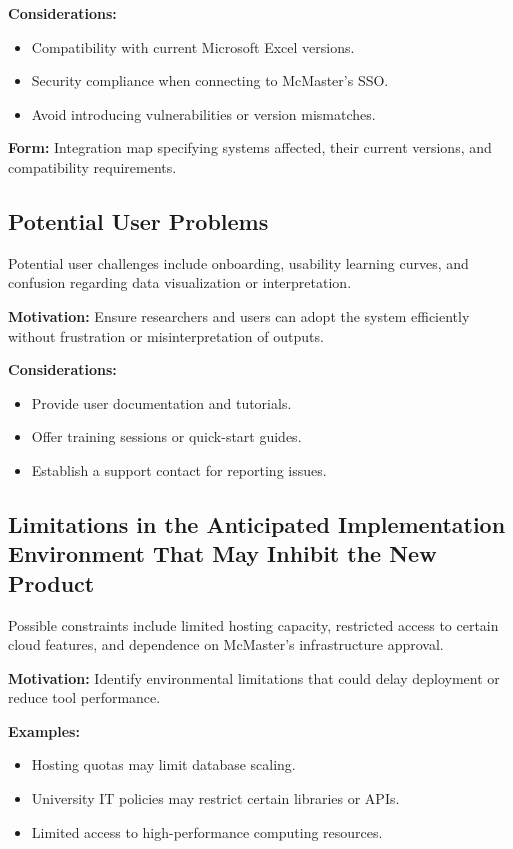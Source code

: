 \documentclass[12pt]{article}
\begin{document}
\textbf{Considerations:}
\begin{itemize}
    \item Compatibility with current Microsoft Excel versions.
    \item Security compliance when connecting to McMaster’s SSO.
    \item Avoid introducing vulnerabilities or version mismatches.
\end{itemize}

\textbf{Form:} Integration map specifying systems affected, their current versions, and compatibility requirements.

\subsection{Potential User Problems}

Potential user challenges include onboarding, usability learning curves, and confusion regarding data visualization or interpretation.

\textbf{Motivation:} Ensure researchers and users can adopt the system efficiently without frustration or misinterpretation of outputs.

\textbf{Considerations:}
\begin{itemize}
    \item Provide user documentation and tutorials.
    \item Offer training sessions or quick-start guides.
    \item Establish a support contact for reporting issues.
\end{itemize}

\subsection{Limitations in the Anticipated Implementation Environment That May Inhibit the New Product}

Possible constraints include limited hosting capacity, restricted access to certain cloud features, and dependence on McMaster’s infrastructure approval.

\textbf{Motivation:} Identify environmental limitations that could delay deployment or reduce tool performance.

\textbf{Examples:}
\begin{itemize}
    \item Hosting quotas may limit database scaling.
    \item University IT policies may restrict certain libraries or APIs.
    \item Limited access to high-performance computing resources.
\end{itemize}
\end{document}
